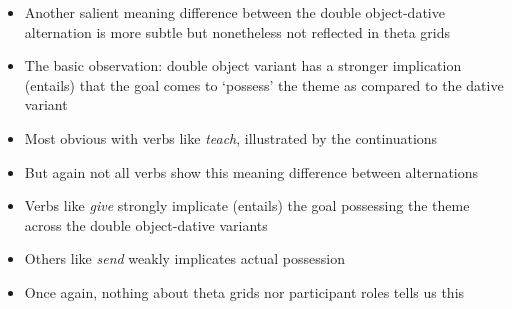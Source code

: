 \documentclass[headrule,footrule]{foils}
\begin{document}
\begin{itemize}
\item Another salient meaning difference between the double object-dative alternation is more subtle but nonetheless not reflected in theta grids
\item The basic observation: double object variant has a stronger implication (entails) that the goal comes to `possess' the theme as compared to the dative variant
\item Most obvious with verbs like \emph{teach}, illustrated by the continuations
\end{itemize}
\begin{exe}
  \ex \begin{xlist}
    \ex {}
    \hspace*{\fill}
    \ex {} \hspace*{\fill} 
  \end{xlist}
\end{exe}


\begin{itemize}
\item But again not all verbs show this meaning difference between alternations
\item Verbs like \emph{give} strongly implicate (entails) the goal possessing the theme across the double object-dative variants
\item Others like \emph{send} weakly implicates actual possession
\item Once again, nothing about theta grids nor participant roles tells us this
\end{itemize}

\begin{exe}
  \ex \begin{xlist}
    \ex {}
    \ex {}
  \end{xlist}
\end{exe}

\begin{exe}
  \ex \begin{xlist}
    \ex {}
    \ex {}
  \end{xlist}
\end{exe}
\end{document}

